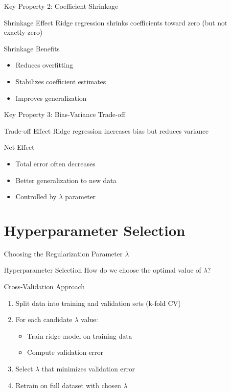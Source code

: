 \documentclass{beamer}
\begin{document}
\begin{frame}{Key Property 2: Coefficient Shrinkage}
\begin{theorembox}{Shrinkage Effect}
Ridge regression shrinks coefficients toward zero (but not exactly zero)
\end{theorembox}
\pause

\begin{keypointsbox}{Shrinkage Benefits}
\begin{itemize}
\item Reduces overfitting
\item Stabilizes coefficient estimates
\item Improves generalization
\end{itemize}
\end{keypointsbox}
\end{frame}

\begin{frame}{Key Property 3: Bias-Variance Trade-off}
\begin{theorembox}{Trade-off Effect}
Ridge regression increases bias but reduces variance
\end{theorembox}
\pause

\begin{keypointsbox}{Net Effect}
\begin{itemize}
\item Total error often decreases
\item Better generalization to new data
\item Controlled by $\lambda$ parameter
\end{itemize}
\end{keypointsbox}
\end{frame}

\section{Hyperparameter Selection}

\begin{frame}{Choosing the Regularization Parameter $\lambda$}
\begin{alertbox}{Hyperparameter Selection}
How do we choose the optimal value of $\lambda$?
\end{alertbox}
\pause

\begin{theorembox}{Cross-Validation Approach}
\begin{enumerate}
\item Split data into training and validation sets (k-fold CV)
\item For each candidate $\lambda$ value:
   \begin{itemize}
   \item Train ridge model on training data
   \item Compute validation error
   \end{itemize}
\item Select $\lambda$ that minimizes validation error
\item Retrain on full dataset with chosen $\lambda$
\end{enumerate}
\end{theorembox}
\end{frame}
\end{document}
